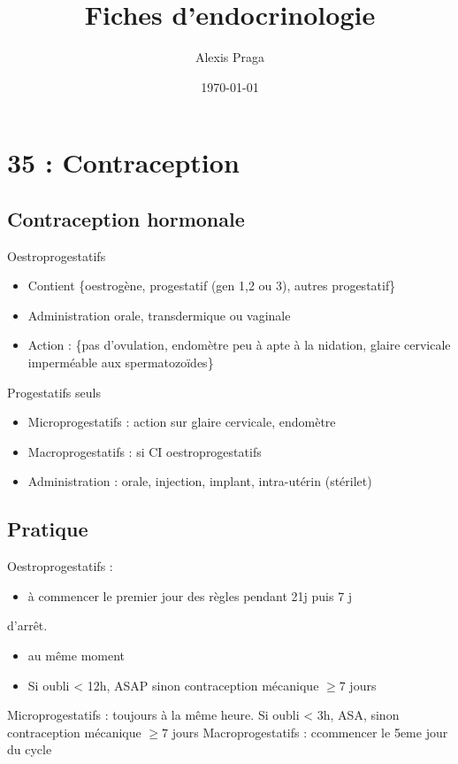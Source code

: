 \documentclass[11pt]{article}
\author{Alexis Praga}
\date{\today}
\title{Fiches d'endocrinologie}
\begin{document}
\maketitle
\tableofcontents


\section{35 : Contraception}
\label{sec:orga9baa36}
\subsection{Contraception hormonale}
\label{sec:org72f1110}
Oestroprogestatifs
\begin{itemize}
\item Contient \{oestrogène, progestatif (gen 1,2 ou 3), autres progestatif\}
\item Administration orale, transdermique ou vaginale
\item Action : \{pas d'ovulation, endomètre peu à apte à la nidation, glaire
cervicale imperméable aux spermatozoïdes\}
\end{itemize}
Progestatifs seuls 
\begin{itemize}
\item Microprogestatifs : action sur glaire cervicale, endomètre
\item Macroprogestatifs : si CI oestroprogestatifs
\item Administration : orale, injection, implant, intra-utérin (stérilet)
\end{itemize}
\subsection{Pratique}
\label{sec:orgb4cba50}
Oestroprogestatifs : 
\begin{itemize}
\item à commencer le premier jour des règles pendant 21j puis 7 j
\end{itemize}
d'arrêt.
\begin{itemize}
\item au même moment
\item Si oubli < 12h, ASAP sinon contraception mécanique \(\ge 7\) jours
\end{itemize}
Microprogestatifs : toujours à la même heure. Si oubli < 3h, ASA, sinon
contraception mécanique \(\ge 7\) jours
Macroprogestatifs : ccommencer le 5eme jour du cycle
\end{document}
